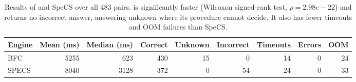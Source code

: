 \begin{table}[t]
  \centering
  \small
  \caption{Results of \solverName{} and SpeCS over all 483 pairs.
\solverName{} is significantly faster (Wilcoxon signed-rank test, $p = 2.98e-22$) and returns no incorrect answer, answering unknown where its procedure cannot decide.
It also has fewer timeouts and \ac{OOM} failures than SpeCS.}
  \begin{tabular}{lrrrrrrrr}
    \toprule
    Engine & Mean (ms) & Median (ms) & Correct & Unknown & Incorrect & Timeouts & Errors & OOM \\
    \midrule
    BFC & 5255 & 623 & 430 & 15 & 0 & 14 & 0 & 24 \\
    SPECS & 8040 & 3128 & 372 & 0 & 54 & 24 & 0 & 33 \\
    \bottomrule
  \end{tabular}
  \label{fig:overview_bfc_specs}
\end{table}
